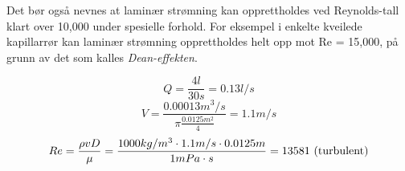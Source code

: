 Det bør også nevnes at laminær strømning kan opprettholdes ved Reynolds-tall klart over 10,000 under spesielle forhold. For eksempel i enkelte kveilede kapillarrør kan laminær strømning opprettholdes helt opp mot Re = 15,000, på grunn av det som kalles {\it Dean-effekten}.







$$Q=\frac{4l}{30s}=0.13 l/s$$
$$V=\frac{0.00013m^3/s}{\pi \frac{0.0125m^2}{4}}=1.1m/s$$
$$Re=\frac{\rho vD}{\mu}=\frac{1000kg/m^3 \cdot 1.1m/s \cdot 0.0125m}{1m Pa\cdot s}=13581 \hbox{ (turbulent)}$$

